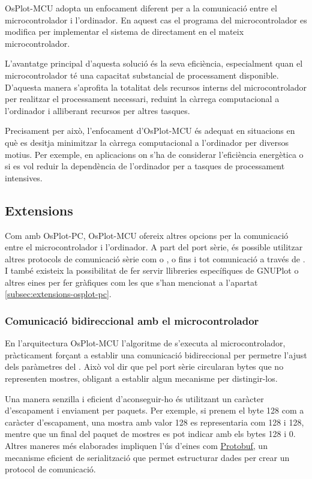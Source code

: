 \documentclass{tfgitic}[2023/06/30]
\begin{document}
OsPlot-MCU adopta un enfocament diferent per a la comunicació entre el
microcontrolador i l'ordinador. En aquest cas el programa del
microcontrolador es modifica per implementar el sistema de
 directament en el mateix microcontrolador.

L'avantatge principal d'aquesta solució és la seva eficiència,
especialment quan el microcontrolador té una capacitat substancial de
processament disponible. D'aquesta manera s'aprofita la totalitat dels
recursos interns del microcontrolador per realitzar el processament
necessari, reduint la càrrega computacional a l'ordinador i alliberant
recursos per altres tasques.

Precisament per això, l'enfocament d'OsPlot-MCU és adequat en
situacions en què es desitja minimitzar la càrrega computacional a
l'ordinador per diversos motius. Per exemple, en aplicacions on s'ha
de considerar l'eficiència energètica o si es vol reduir la
dependència de l'ordinador per a tasques de processament intensives.

\subsection{Extensions}

Com amb OsPlot-PC, OsPlot-MCU ofereix altres opcions per la
comunicació entre el microcontrolador i l'ordinador. A part del port
sèrie, és possible utilitzar altres protocols de comunicació sèrie com
 o , o fins i tot comunicació a través de
. I també existeix la possibilitat de fer servir
llibreries específiques de GNUPlot o altres eines per fer gràfiques
com les que s'han mencionat a l'apartat
\ref{subsec:extensions-osplot-pc}.

\subsubsection{Comunicació bidireccional amb el microcontrolador}

En l'arquitectura OsPlot-MCU l'algoritme de  s'executa al
microcontrolador, pràcticament forçant a establir una comunicació
bidireccional per permetre l'ajust dels paràmetres del .
Això vol dir que pel port sèrie circularan bytes que no representen
mostres, obligant a establir algun mecanisme per distingir-los.

Una manera senzilla i eficient d'aconseguir-ho és utilitzant un
caràcter d'escapament i enviament per paquets. Per exemple, si prenem
el byte \num{128} com a caràcter d'escapament, una mostra amb valor
\num{128} es representaria com \num{128} i \num{128}, mentre que un
final del paquet de mostres es pot indicar amb els bytes \num{128} i
\num{0}. Altres maneres més elaborades impliquen l'ús d'eines com
\href{https://protobuf.dev/}{\underline{Protobuf}}, un mecanisme
eficient de serialització que permet estructurar dades per crear un
protocol de comunicació.
\end{document}
